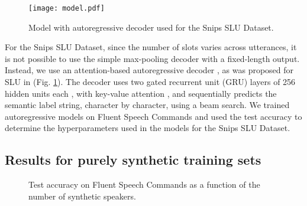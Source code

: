 \documentclass{article}
\begin{document}
\begin{figure}[t]
    \centering
    \texttt{[image: model.pdf]}
    \caption{Model with autoregressive decoder used for the Snips SLU Dataset.}
    \label{fig:autoregressive-decoder}
\end{figure}

For the Snips SLU Dataset, since the number of slots varies across utterances,  it is not possible to use the simple max-pooling decoder with a fixed-length output. Instead, we use an attention-based autoregressive decoder \cite{bahdanau2014neural}, as was proposed for SLU in \cite{Haghani2018} (Fig. \ref{fig:autoregressive-decoder}). The decoder uses two gated recurrent unit (GRU) layers of 256 hidden units each \cite{gru}, with key-value attention \cite{transformers}, and sequentially predicts the semantic label string, character by character, using a beam search. We trained autoregressive models on Fluent Speech Commands and used the test accuracy to determine the hyperparameters used in the models for the Snips SLU Dataset. 

\subsection{Results for purely synthetic training sets}\label{ssec:purely_synthetic}



\begin{figure}[t]
    \centering
\hspace*{-0.5cm} 
    \caption{Test accuracy on Fluent Speech Commands as a function of the number of synthetic speakers.}
    \label{fig:synth_only}
\end{figure}
\end{document}
